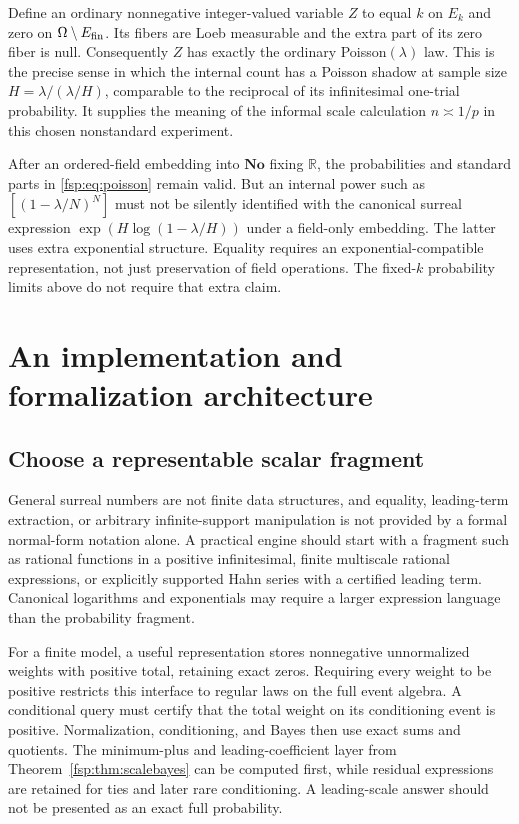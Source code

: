 \documentclass[11pt,a4paper]{article}
\numberwithin{equation}{section}
\theoremstyle{definition}
\theoremstyle{remark}
\newcommand{\R}{\mathbb R}
\newcommand{\No}{\mathbf{No}}
\begin{document}
Define an ordinary nonnegative integer-valued variable $Z$ to equal $k$ on $E_k$
and zero on $\Omega\setminus E_{\rm fin}$. Its fibers are Loeb
measurable and the extra part of its zero fiber is null. Consequently
$Z$ has exactly the ordinary Poisson$(\lambda)$ law. This is the precise
sense in which the internal count has a Poisson shadow at sample size
$H=\lambda/(\lambda/H)$, comparable to the reciprocal of its infinitesimal
one-trial probability. It supplies the meaning of the informal scale
calculation $n\asymp1/p$ in this chosen nonstandard experiment.

After an ordered-field embedding into $\No$ fixing $\R$, the probabilities and
standard parts in \eqref{fsp:eq:poisson} remain valid. But an internal power
such as $[(1-\lambda/N)^N]$ must not be silently identified with the
canonical surreal expression $\exp(H\log(1-\lambda/H))$ under a
field-only embedding. The latter uses extra exponential structure.
Equality requires an exponential-compatible representation, not just
preservation of field operations. The fixed-$k$ probability limits
above do not require that extra claim.

\section{An implementation and formalization architecture}
\label{fsp:sec:implementation}

\subsection{Choose a representable scalar fragment}

General surreal numbers are not finite data structures, and equality,
leading-term extraction, or arbitrary infinite-support manipulation is
not provided by a formal normal-form notation alone. A practical engine
should start with a fragment such as rational functions in a positive
infinitesimal, finite multiscale rational expressions, or explicitly
supported Hahn series with a certified leading term. Canonical logarithms
and exponentials may require a larger expression language than the
probability fragment.

For a finite model, a useful representation stores nonnegative
unnormalized weights with positive total, retaining exact zeros. Requiring
every weight to be positive restricts this interface to regular laws on
the full event algebra. A conditional query must certify that the total
weight on its conditioning event is positive. Normalization,
conditioning, and Bayes then use exact sums and quotients. The minimum-plus
and leading-coefficient layer from Theorem~\ref{fsp:thm:scalebayes} can be
computed first, while residual expressions are retained for ties and
later rare conditioning. A leading-scale answer should not be presented
as an exact full probability.
\end{document}
